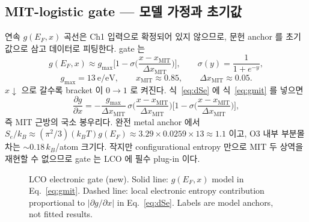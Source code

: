 \documentclass[11pt,a4paper]{article}
\begin{document}
\subsection{MIT-logistic gate — 모델 가정과 초기값}
연속 $g(E_F,x)$ 곡선은 Ch1 입력으로 확정되어 있지 않으므로, 문헌 anchor 를 초기값으로 삼고 데이터로 피팅한다. gate 는
\begin{equation}
g(E_F,x)\approx g_{\max}\Big[1-\sigma\!\Big(\frac{x-x_\mathrm{MIT}}{\Delta x_\mathrm{MIT}}\Big)\Big],
\qquad
\sigma(y)=\frac{1}{1+e^{-y}},
\label{eq:gmit}
\end{equation}
\begin{equation}
g_{\max}=13\ \mathrm{e/eV},\qquad
x_\mathrm{MIT}\approx0.85,\qquad
\Delta x_\mathrm{MIT}\approx0.05.
\label{eq:gmitpars}
\end{equation}
$x\downarrow$ 으로 갈수록 bracket 이 $0\to1$ 로 켜진다. 식~\eqref{eq:dSe} 에 식~\eqref{eq:gmit} 를 넣으면
\begin{equation}
\frac{\partial g}{\partial x}
=-\frac{g_{\max}}{\Delta x_\mathrm{MIT}}\,
\sigma\!\Big(\frac{x-x_\mathrm{MIT}}{\Delta x_\mathrm{MIT}}\Big)
\Big[1-\sigma\!\Big(\frac{x-x_\mathrm{MIT}}{\Delta x_\mathrm{MIT}}\Big)\Big],
\label{eq:gmitderiv}
\end{equation}
즉 MIT 근방의 국소 봉우리다. 완전 metal anchor 에서 $S_e/k_B\approx(\pi^2/3)(k_BT)g(E_F)
\approx3.29\times0.0259\times13\approx1.1$ 이고, O3 내부 부분몰 차는 $\sim0.18\,k_B$/atom 크기다. 작지만
configurational entropy 만으로 MIT 두 상역을 재현할 수 없으므로 gate 는 LCO 에 필수 plug-in 이다.

\begin{figure}[t]
\centering
{}
\caption{LCO electronic gate (new). Solid line: $g(E_F,x)$ model in Eq.~\eqref{eq:gmit}. Dashed line: local electronic entropy contribution proportional to $|\partial g/\partial x|$ in Eq.~\eqref{eq:dSe}. Labels are model anchors, not fitted results.}
\label{fig:lco_gate}
\end{figure}
\end{document}
